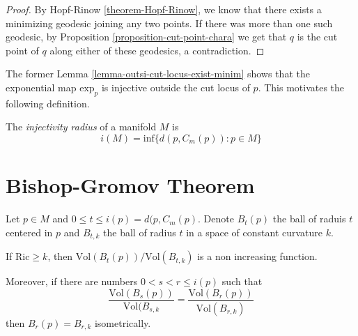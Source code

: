 \begin{proof}
By Hopf-Rinow \ref{theorem-Hopf-Rinow}, we
know that
there exists a minimizing geodesic joining
any two points. If there was more
than one such geodesic, by
Proposition \ref{proposition-cut-point-chara}
we get that $q$ is the cut point of  $q$
along either of these geodesics,
a contradiction.
\end{proof}

The former Lemma
\ref{lemma-outsi-cut-locus-exist-minim}
shows that the exponential map $\text{exp}_p$
 is injective outside the cut locus of $p$.
This motivates the following definition.

\begin{definition}
\label{definition-injectivity-radius}
The {\it injectivity radius} of a manifold
$M$ is
$$
i(M)=\text{inf}\{d(p,C_m(p)):p \in M\}
$$
\end{definition}

\section{Bishop-Gromov Theorem}
\label{section-bishop-gromov}

\begin{theorem}
\label{theorem-Bishop-Gromov}
Let $p \in M$ and $0\leq t \leq
i(p)=d(p,C_m(p)$. Denote $B_t(p)$ the ball of
raduis $t$ centered in $p$ and $B_{t,k}$ the
ball of radius $t$ in a space of
constant curvature $k$.

If $\text{Ric}\geq k$, then
$\text{Vol}(B_t(p))/\text{Vol}(B_{t,k})$ is a
non
increasing function.

Moreover, if there are numbers  $0<s<r\leq
i(p)$ such that
$$
\frac{\text{Vol}(B_s(p))}{\text{Vol}(B_{s,k}}
=
\frac{\text{Vol}(B_r(p))}{\text{Vol}(B_{r,k})
}
$$
then $B_r(p)=B_{r,k}$ isometrically.
\end{theorem}

